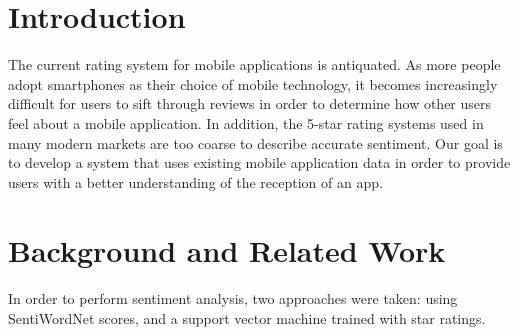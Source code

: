 \documentclass{acm_proc_article-sp}
\begin{document}
{%
}

\maketitle

\section{Introduction}
The current rating system for mobile applications is antiquated. As more people adopt smartphones as their choice of mobile technology, it becomes increasingly
difficult for users to sift through reviews in order to determine how other users feel about a mobile application. In addition, the 5-star rating systems used in many modern markets are too coarse to describe accurate sentiment. Our goal is to develop a system that uses existing mobile application data in order to provide users with a better understanding of the reception of an app.

\section{Background and Related Work}
In order to perform sentiment analysis, two approaches were taken: using SentiWordNet scores, and a support vector machine trained with star ratings.
\end{document}
